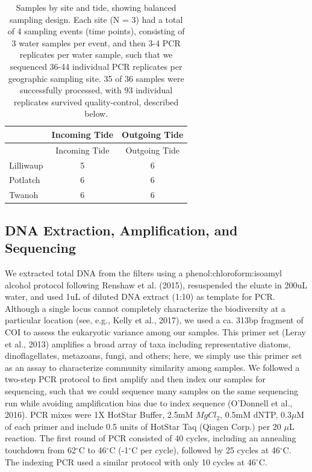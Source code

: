 \documentclass[fleqn,10pt,lineno]{wlpeerj} %
\begin{document}
\begin{longtable}[]{@{}lcc@{}}
\caption{Samples by site and tide, showing balanced sampling design.
Each site (N = 3) had a total of 4 sampling events (time points),
consisting of 3 water samples per event, and then 3-4 PCR replicates per
water sample, such that we sequenced 36-44 individual PCR replicates per
geographic sampling site. 35 of 36 samples were successfully processed,
with 93 individual replicates survived quality-control, described
below.}\tabularnewline
\toprule
& Incoming Tide & Outgoing Tide\tabularnewline
\midrule
\endfirsthead
\toprule
& Incoming Tide & Outgoing Tide\tabularnewline
\midrule
\endhead
Lilliwaup & 5 & 6\tabularnewline
Potlatch & 6 & 6\tabularnewline
Twanoh & 6 & 6\tabularnewline
\bottomrule
\end{longtable}

\subsection{DNA Extraction, Amplification, and
Sequencing}\label{dna-extraction-amplification-and-sequencing}

We extracted total DNA from the filters using a
phenol:chloroform:isoamyl alcohol protocol following Renshaw et al.
(2015), resuspended the eluate in 200uL water, and used 1uL of diluted
DNA extract (1:10) as template for PCR. Although a single locus cannot
completely characterize the biodiversity at a particular location (see,
e.g., Kelly et al., 2017), we used a ca. 313bp fragment of COI to assess the
eukaryotic variance among our samples. This primer set (Leray et al.,
2013) amplifies a broad array of taxa including representative diatoms,
dinoflagellates, metazoans, fungi, and others; here, we simply use this
primer set as an assay to characterize community similarity among
samples. We followed a two-step PCR protocol to first amplify and then
index our samples for sequencing, such that we could sequence many
samples on the same sequencing run while avoiding amplification bias due
to index sequence (O'Donnell et al., 2016). PCR mixes were 1X HotStar
Buffer, 2.5mM \(MgCl_2\), 0.5mM dNTP, 0.3\(\mu\)M of each primer and
include 0.5 units of HotStar Taq (Qiagen Corp.) per 20 \(\mu\)L
reaction. The first round of PCR consisted of 40 cycles, including an
annealing touchdown from 62\(^\circ\)C to 46\(^\circ\)C (-1\(^\circ\)C
per cycle), followed by 25 cycles at 46\(^\circ\)C. The indexing PCR
used a similar protocol with only 10 cycles at 46\(^\circ\)C.
\end{document}
